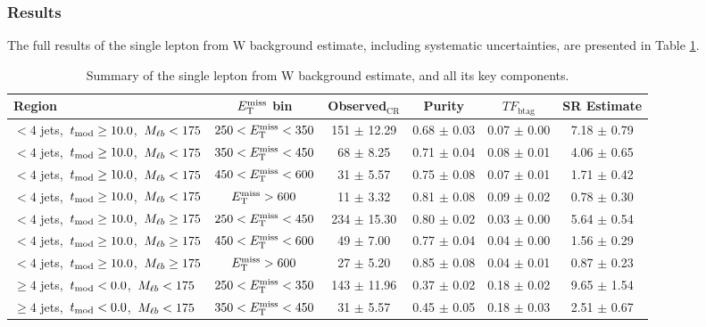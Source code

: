 \subsubsection{Results}
\label{sssec:stop:1lw:results}

The full results of the single lepton from W background estimate,
including systematic uncertainties, are presented in Table
\ref{tab:stop:1lw:results}.

\begin{table}
\centering
\small
\caption{Summary of the single lepton from W background estimate, and
  all its key components.}
\label{tab:stop:1lw:results}
\begin{tabular}{|l|c|c|c|c|c|} \hline
Region & $E_\text{T}^\text{miss}$ bin & Observed$_\text{CR}$ & Purity & $TF_\text{btag}$ & SR Estimate \\ \hline \hline
 $<4$ jets,~$t_\text{mod} \ge10.0$,~$M_{\ell b} <175$        & $250<E_\text{T}^\text{miss}<350$ & 151 $\pm$ 12.29 & 0.68 $\pm$ 0.03  & 0.07 $\pm$ 0.00 & 7.18 $\pm$ 0.79 \\
 $<4$ jets,~$t_\text{mod} \ge10.0$,~$M_{\ell b} <175$        & $350<E_\text{T}^\text{miss}<450$ & 68 $\pm$ 8.25   & 0.71 $\pm$ 0.04  & 0.08 $\pm$ 0.01 & 4.06 $\pm$ 0.65 \\
 $<4$ jets,~$t_\text{mod} \ge10.0$,~$M_{\ell b} <175$        & $450<E_\text{T}^\text{miss}<600$ & 31 $\pm$ 5.57   & 0.75 $\pm$ 0.08  & 0.07 $\pm$ 0.01 & 1.71 $\pm$ 0.42 \\
 $<4$ jets,~$t_\text{mod} \ge10.0$,~$M_{\ell b} <175$        & $E_\text{T}^\text{miss}>600$     & 11 $\pm$ 3.32   & 0.81 $\pm$ 0.08  & 0.09 $\pm$ 0.02 & 0.78 $\pm$ 0.30 \\
\hline
 $<4$ jets,~$t_\text{mod} \ge10.0$,~$M_{\ell b} \ge175$      & $250<E_\text{T}^\text{miss}<450$ & 234 $\pm$ 15.30 & 0.80 $\pm$ 0.02  & 0.03 $\pm$ 0.00 & 5.64 $\pm$ 0.54 \\
 $<4$ jets,~$t_\text{mod} \ge10.0$,~$M_{\ell b} \ge175$      & $450<E_\text{T}^\text{miss}<600$ & 49 $\pm$ 7.00   & 0.77 $\pm$ 0.04  & 0.04 $\pm$ 0.00 & 1.56 $\pm$ 0.29 \\
 $<4$ jets,~$t_\text{mod} \ge10.0$,~$M_{\ell b} \ge175$      & $E_\text{T}^\text{miss}>600$     & 27 $\pm$ 5.20   & 0.85 $\pm$ 0.08  & 0.04 $\pm$ 0.01 & 0.87 $\pm$ 0.23 \\
\hline
 $\ge4$ jets,~$t_\text{mod} <0.0$,~$M_{\ell b} <175$         & $250<E_\text{T}^\text{miss}<350$ & 143 $\pm$ 11.96 & 0.37 $\pm$ 0.02  & 0.18 $\pm$ 0.02 & 9.65 $\pm$ 1.54 \\
 $\ge4$ jets,~$t_\text{mod} <0.0$,~$M_{\ell b} <175$         & $350<E_\text{T}^\text{miss}<450$ & 31 $\pm$ 5.57   & 0.45 $\pm$ 0.05  & 0.18 $\pm$ 0.03 & 2.51 $\pm$ 0.67 \\

\end{tabular}
\end{table}

